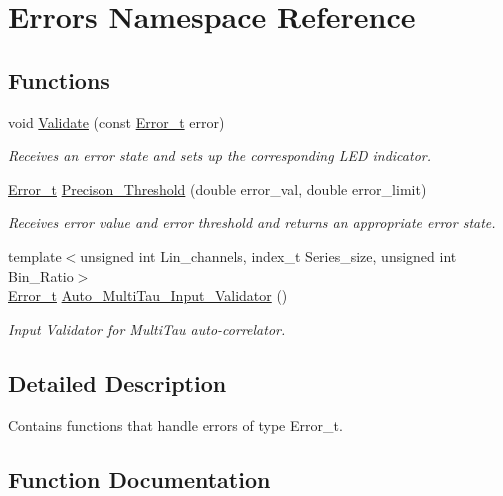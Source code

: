 \hypertarget{namespaceErrors}{}\section{Errors Namespace Reference}
\label{namespaceErrors}
\subsection*{Functions}
\begin{DoxyCompactItemize}
\item 
void \hyperlink{namespaceErrors_a1fcd582e2074f8fad3a450d1b6b42aaa}{Validate} (const \hyperlink{errors_8hpp_a4e8c0d09726859e3d3369c0da5a1aa7f}{Error\+\_\+t} error)
\begin{DoxyCompactList}\small\item\em Receives an error state and sets up the corresponding L\+ED indicator. \end{DoxyCompactList}\item 
\hyperlink{errors_8hpp_a4e8c0d09726859e3d3369c0da5a1aa7f}{Error\+\_\+t} \hyperlink{namespaceErrors_a13171d3d324164c9f7a9508d5a16b0c5}{Precison\+\_\+\+Threshold} (double error\+\_\+val, double error\+\_\+limit)
\begin{DoxyCompactList}\small\item\em Receives error value and error threshold and returns an appropriate error state. \end{DoxyCompactList}\item 
{\footnotesize template$<$unsigned int Lin\+\_\+channels, index\+\_\+t Series\+\_\+size, unsigned int Bin\+\_\+\+Ratio$>$ }\\\hyperlink{errors_8hpp_a4e8c0d09726859e3d3369c0da5a1aa7f}{Error\+\_\+t} \hyperlink{namespaceErrors_a7010d07de8236f9a17b302c78f37483e}{Auto\+\_\+\+Multi\+Tau\+\_\+\+Input\+\_\+\+Validator} ()
\begin{DoxyCompactList}\small\item\em Input Validator for Multi\+Tau auto-\/correlator. \end{DoxyCompactList}\end{DoxyCompactItemize}


\subsection{Detailed Description}
Contains functions that handle errors of type {\ttfamily Error\+\_\+t}. 

\subsection{Function Documentation}
\mbox{\label{namespaceErrors_a7010d07de8236f9a17b302c78f37483e}} 
